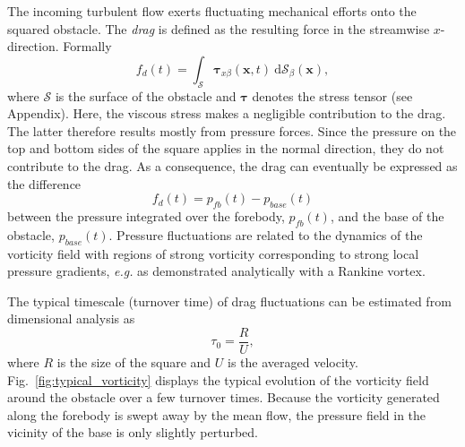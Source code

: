 \documentclass[pre,aps,floatfix,10pt,superscriptaddress, notitlepage,preprint]{revtex4-1}
\begin{document}

%
The incoming turbulent flow exerts fluctuating mechanical efforts onto the squared obstacle.
The \textit{drag} is defined as the resulting force in the streamwise $x$-direction. Formally 
\begin{equation}
\label{eq:drag_definition}
f_d(t) = \int_{\mathcal{S}} \boldsymbol{\tau}_{x \beta}(\mathbf{x},t) ~ \mathrm{d}{\mathcal{S}}_\beta(\mathbf{x}),
\end{equation}
where $\mathcal{S}$ is the surface of the obstacle and $\boldsymbol{\tau}$ denotes the stress tensor (see Appendix). 
Here, the viscous stress makes a negligible contribution to the drag. The latter therefore results mostly from pressure forces.
%
Since the pressure on the top and bottom sides of the square applies in the normal direction, they do not contribute to the drag. 
As a consequence, the drag can eventually be expressed as the difference 
\begin{equation}
\label{eq:drag_approx}
f_d(t) = p_{fb}(t) - p_{base}(t)
\end{equation}
between the pressure integrated over the forebody, $p_{fb}(t)$, and the base of the obstacle, $p_{base}(t)$.
Pressure fluctuations are related to the dynamics of the vorticity field with regions of strong vorticity corresponding to strong local pressure gradients, \emph{e.g.} as demonstrated analytically with a Rankine vortex.
%
%

%
The typical timescale (turnover time) of drag fluctuations can be estimated from dimensional analysis as
\begin{equation}
\label{eq:turnover_time}
\tau_0 = \frac{R}{U},
\end{equation}
where $R$ is the size of the square and $U$ is the averaged velocity. 
%
%
Fig.~\ref{fig:typical_vorticity} displays the typical evolution of the vorticity field around the obstacle over a few turnover times.
Because the vorticity generated along the forebody is swept away by the mean flow, the pressure field
in the vicinity of the base is only slightly perturbed.
\end{document}
